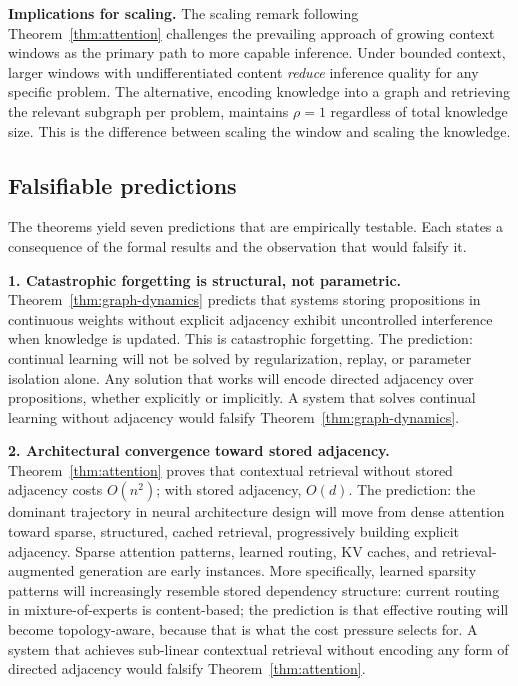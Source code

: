 \documentclass[11pt]{article}
\theoremstyle{definition}
\begin{document}
\textbf{Implications for scaling.}
The scaling remark following Theorem~\ref{thm:attention} challenges the
prevailing approach of growing context windows as the primary path to
more capable inference.
Under bounded context, larger windows with undifferentiated content
\emph{reduce} inference quality for any specific problem. The
alternative, encoding knowledge into a graph and retrieving the
relevant subgraph per problem, maintains $\rho = 1$ regardless of
total knowledge size. This is the difference between scaling the window
and scaling the knowledge.

\subsection{Falsifiable predictions}

The theorems yield seven predictions that are empirically testable. Each
states a consequence of the formal results and the observation that
would falsify it.

\textbf{1. Catastrophic forgetting is structural, not parametric.}
Theorem~\ref{thm:graph-dynamics} predicts that systems storing
propositions in continuous weights without explicit adjacency exhibit
uncontrolled interference when knowledge is updated. This is
catastrophic forgetting. The prediction: continual learning will not be
solved by regularization, replay, or parameter isolation alone. Any
solution that works will encode directed adjacency over propositions,
whether explicitly or implicitly. A system that solves continual
learning without adjacency would falsify Theorem~\ref{thm:graph-dynamics}.

\textbf{2. Architectural convergence toward stored adjacency.}
Theorem~\ref{thm:attention} proves that contextual retrieval without
stored adjacency costs $O(n^2)$; with stored adjacency, $O(d)$. The
prediction: the dominant trajectory in neural architecture design will
move from dense attention toward sparse, structured, cached retrieval,
progressively building explicit adjacency. Sparse attention patterns,
learned routing, KV caches, and retrieval-augmented generation are early
instances. More specifically, learned sparsity patterns will
increasingly resemble stored dependency structure: current routing in
mixture-of-experts is content-based; the prediction is that effective
routing will become topology-aware, because that is what the cost
pressure selects for. A system that achieves sub-linear contextual
retrieval without encoding any form of directed adjacency would falsify
Theorem~\ref{thm:attention}.
\end{document}
